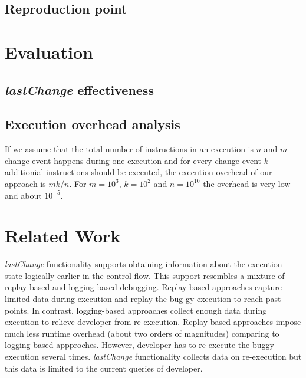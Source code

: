 \documentclass[preprint]{sigplanconf}
\begin{document}
\subsection{Reproduction point}

\section{Evaluation}
\subsection{\textit{lastChange} effectiveness}

\subsection{Execution overhead analysis}
If we assume that the total number of instructions in an execution is
$n$ and $m$ change event happens during one execution and for every
change event $k$ additionial instructions should be executed, the
execution overhead of our approach is $mk/n$. For $m=10^3$, $k=10^2$
and $n=10^{10}$ the overhead is very low and about $10^{-5}$.

\section{Related Work}

\textit{lastChange} functionality supports obtaining information about
the execution state logically earlier in the control flow. This
support resembles a mixture of replay-based and logging-based
debugging. Replay-based approaches capture limited data during
execution and replay the bug-gy execution to reach past points. In
contrast, logging-based approaches collect enough data during
execution to relieve developer from re-execution. Replay-based
approaches impose much less runtime overhead (about two orders of
magnitudes) comparing to logging-based appproches. However, developer
has to re-execute the buggy execution several
times. \textit{lastChange} functionality collects data on re-execution
but this data is limited to the current queries of developer.
\end{document}
